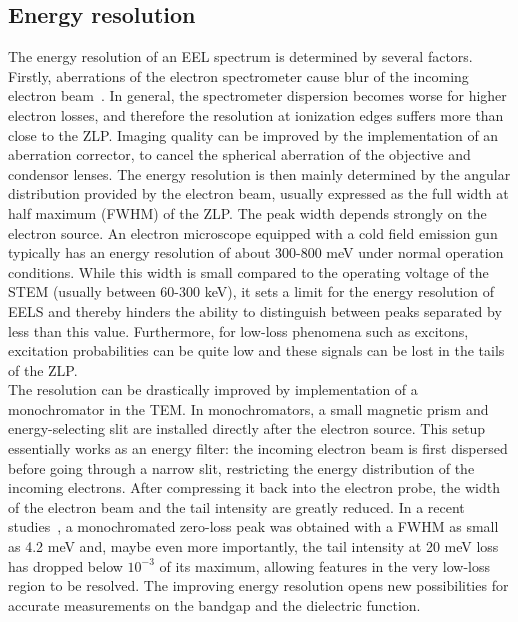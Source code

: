 \subsection{Energy resolution}
The energy resolution of an EEL spectrum is determined by several factors. 
%
Firstly, aberrations of the electron spectrometer cause blur of the incoming 
electron beam~\cite{Freitag:2005}. 
%
In general, the spectrometer dispersion becomes worse for higher electron losses,
and therefore the resolution at ionization edges suffers more than close to the
ZLP.
%
Imaging quality can be improved by the implementation of an aberration corrector, 
to cancel the spherical aberration of the objective and condensor lenses. 
%
The energy resolution is then mainly determined by the angular distribution 
provided by the electron beam, usually expressed as the full width at half maximum (FWHM) of the ZLP. 
%
The peak width depends strongly on the electron source. 
An  electron  microscope  equipped  with  a  cold
field emission gun typically has an energy resolution of about 300-800 meV 
under normal operation conditions.  
%
While this width is small compared to the operating voltage of the STEM (usually between 60-300 keV), 
it sets a limit for the energy resolution of EELS and thereby hinders the ability to distinguish 
between peaks separated by less than this value. 
%
Furthermore, for low-loss phenomena such as excitons, 
excitation probabilities can be quite low and these signals can be lost in the tails of the ZLP.\\

The resolution can be drastically improved by implementation of a monochromator 
in the TEM. 
%
In monochromators, a small magnetic prism and energy-selecting slit are installed 
directly after the electron source.
%
This setup essentially works as an energy filter: the incoming electron beam is first dispersed 
before going through a narrow slit, restricting the energy distribution of the incoming electrons. 
%
After compressing it back into the electron probe, the width of the electron beam 
and the tail intensity are greatly reduced.  
%
In a recent studies~\cite{Krivanek:2009}, a monochromated zero-loss peak was obtained 
with a FWHM as small as 4.2 meV and, maybe even more importantly, 
the tail intensity at 20 meV loss has dropped below $10^{-3}$ of its maximum, 
allowing features in the very low-loss region to be resolved. 
%
The improving energy resolution opens new possibilities for accurate measurements
on the bandgap and the 
dielectric function.

